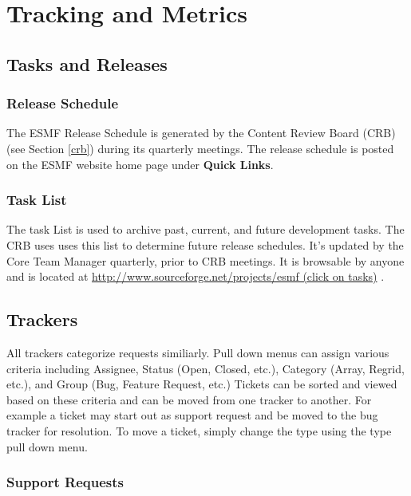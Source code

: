 
\section{Tracking and Metrics}
\label{tracking}

\subsection{Tasks and Releases}
\label{sec:build}

\subsubsection{Release Schedule}
The ESMF Release Schedule is generated by the Content Review Board (CRB) (see Section \autoref{crb}) during its quarterly meetings.  The release schedule is posted on the ESMF website home page under {\bf Quick Links}.

\subsubsection{Task List}

The task List is used to archive past, current, and future development tasks.  The CRB uses uses this list to determine future release schedules.  It's updated by the Core Team Manager quarterly, prior to CRB meetings.  It is browsable by anyone and is located at
\href{http://www.sourceforge.net/projects/esmf}{http://www.sourceforge.net/projects/esmf (click on tasks)} .

\subsection{Trackers}
\label{tracking_tools}

All trackers categorize requests similiarly. Pull down menus can assign various criteria including Assignee, Status (Open, Closed, etc.), Category (Array, Regrid, etc.), and Group (Bug, Feature Request, etc.)  Tickets can be sorted and viewed based on these criteria and can be moved from one tracker to another. For example a ticket may start out as support request and be moved to the bug tracker for resolution.  To move a ticket, simply change the type using the type pull down menu. 

\subsubsection{Support Requests}

